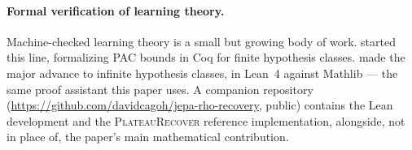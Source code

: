 \paragraph{Formal verification of learning theory.}
Machine-checked learning theory is a small but growing body of work.
\citet{Bagnall2019} started this line, formalizing PAC bounds in Coq for finite
hypothesis classes. \citet{Sonoda2026} made the major advance to infinite hypothesis
classes, in Lean~4 against Mathlib --- the same proof assistant this paper uses. A companion repository
(\url{https://github.com/davidcagoh/jepa-rho-recovery}, public) contains the Lean
development and the \textsc{PlateauRecover} reference implementation, alongside, not
in place of, the paper's main mathematical contribution. 
